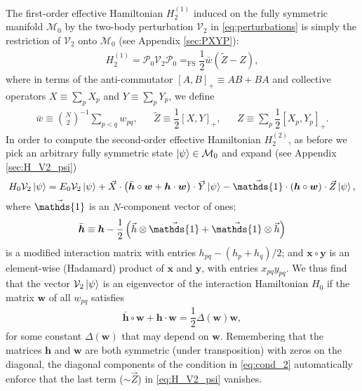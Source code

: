 \documentclass[nofootinbib,notitlepage,11pt]{revtex4-2}
\newcommand{\f}[2]{\dfrac{#1}{#2}} %
\newcommand{\p}[1]{\left(#1\right)} %
\renewcommand{\sp}[1]{\left[#1\right]} %
\renewcommand{\c}{\cdot} %
\renewcommand{\oc}{\circ} %
\newcommand{\m}{\bm} %
\renewcommand{\v}{\vec} %
\newcommand{\1}{\mathds{1}}
\newcommand{\M}{\mathcal{M}}
\renewcommand{\P}{\mathcal{P}}
\newcommand{\V}{\mathcal{V}}
\newcommand{\FSEQ}{=_{\text{FS}}}
\begin{document}
The first-order effective Hamiltonian $H_2^{(1)}$ induced on the fully
symmetric manifold $\M_0$ by the two-body perturbation $\V_2$ in
\eqref{eq:perturbations} is simply the restriction of $\V_2$ onto
$\M_0$ (see Appendix \ref{sec:PXYP}):
\begin{align}
  H_2^{(1)}
  = \P_0 \V_2 \P_0
  \FSEQ \f12 \bar w \p{\tilde Z - Z},
\end{align}
where in terms of the anti-commutator $\sp{A,B}_+\equiv AB+BA$ and
collective operators $X\equiv\sum_p X_p$ and $Y\equiv\sum_p Y_p$, we
define
\begin{align}
  \bar w \equiv {N\choose 2}^{-1} \sum_{p<q} w_{pq},
  &&
  \tilde Z \equiv \f12 \sp{X,Y}_+,
  &&
  Z \equiv \sum_p \f12 \sp{X_p, Y_p}_+.
\end{align}
In order to compute the second-order effective Hamiltonian
$H_2^{(2)}$, as before we pick an arbitrary fully symmetric state
$\ket\psi\in\M_0$ and expand (see Appendix \ref{sec:H_V2_psi})
\begin{align}
  H_0 \V_2 \ket\psi
  = E_0 \V_2 \ket\psi
  + \v X \c \p{\bar{\m h}\oc\m w + \m h\c\m w} \c \v Y \ket\psi
  - \v\1 \c \p{\m h\oc\m w} \c \v Z \ket\psi,
  \label{eq:H_V2_psi}
\end{align}
where $\v\1$ is an $N$-component vector of ones;
\begin{align}
  \bar{\m h}
  \equiv \m h - \f12\p{\v h\otimes\v\1 + \v\1\otimes\v h}
\end{align}
is a modified interaction matrix with entries $h_{pq}-\p{h_p+h_q}/2$;
and $\m x\oc\m y$ is an element-wise (Hadamard) product of $\m x$ and
$\m y$, with entries $x_{pq}y_{pq}$.  We thus find that the vector
$\V_2\ket\psi$ is an eigenvector of the interaction Hamiltonian $H_0$
if the matrix $\m w$ of all $w_{pq}$ satisfies
\begin{align}
  \bar{\m h}\oc\m w + \m h\c\m w = \f12 \Delta\p{\m w} \m w,
  \label{eq:cond_2}
\end{align}
for some constant $\Delta\p{\m w}$ that may depend on $\m w$.
Remembering that the matrices $\m h$ and $\m w$ are both symmetric
(under transposition) with zeros on the diagonal, the diagonal
components of the condition in \eqref{eq:cond_2} automatically enforce
that the last term ($\sim\v Z$) in \eqref{eq:H_V2_psi} vanishes.
\end{document}
